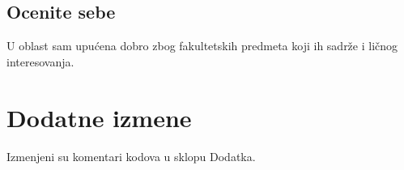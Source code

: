 \documentclass[a4paper]{report}
\begin{document}
\section{Ocenite sebe}

U oblast sam upućena dobro zbog fakultetskih predmeta koji ih sadrže i ličnog interesovanja.


\chapter{Dodatne izmene}
Izmenjeni su komentari kodova u sklopu Dodatka.
\end{document}
